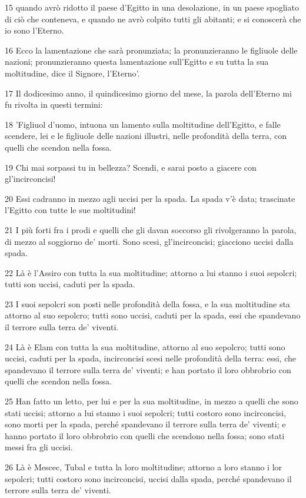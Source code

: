 \par 15 quando avrò ridotto il paese d'Egitto in una desolazione, in un paese spogliato di ciò che conteneva, e quando ne avrò colpito tutti gli abitanti; e si conoscerà che io sono l'Eterno.
\par 16 Ecco la lamentazione che sarà pronunziata; la pronunzieranno le figliuole delle nazioni; pronunzieranno questa lamentazione sull'Egitto e su tutta la sua moltitudine, dice il Signore, l'Eterno'.
\par 17 Il dodicesimo anno, il quindicesimo giorno del mese, la parola dell'Eterno mi fu rivolta in questi termini:
\par 18 'Figliuol d'uomo, intuona un lamento sulla moltitudine dell'Egitto, e falle scendere, lei e le figliuole delle nazioni illustri, nelle profondità della terra, con quelli che scendon nella fossa.
\par 19 Chi mai sorpassi tu in bellezza? Scendi, e sarai posto a giacere con gl'incirconcisi!
\par 20 Essi cadranno in mezzo agli uccisi per la spada. La spada v'è data; trascinate l'Egitto con tutte le sue moltitudini!
\par 21 I più forti fra i prodi e quelli che gli davan soccorso gli rivolgeranno la parola, di mezzo al soggiorno de' morti. Sono scesi, gl'incirconcisi; giacciono uccisi dalla spada.
\par 22 Là è l'Assiro con tutta la sua moltitudine; attorno a lui stanno i suoi sepolcri; tutti son uccisi, caduti per la spada.
\par 23 I suoi sepolcri son posti nelle profondità della fossa, e la sua moltitudine sta attorno al suo sepolcro; tutti sono uccisi, caduti per la spada, essi che spandevano il terrore sulla terra de' viventi.
\par 24 Là è Elam con tutta la sua moltitudine, attorno al suo sepolcro; tutti sono uccisi, caduti per la spada, incirconcisi scesi nelle profondità della terra: essi, che spandevano il terrore sulla terra de' viventi; e han portato il loro obbrobrio con quelli che scendon nella fossa.
\par 25 Han fatto un letto, per lui e per la sua moltitudine, in mezzo a quelli che sono stati uccisi; attorno a lui stanno i suoi sepolcri; tutti costoro sono incirconcisi, sono morti per la spada, perché spandevano il terrore sulla terra de' viventi; e hanno portato il loro obbrobrio con quelli che scendono nella fossa; sono stati messi fra gli uccisi.
\par 26 Là è Mescec, Tubal e tutta la loro moltitudine; attorno a loro stanno i lor sepolcri; tutti costoro sono incirconcisi, uccisi dalla spada, perché spandevano il terrore sulla terra de' viventi.
